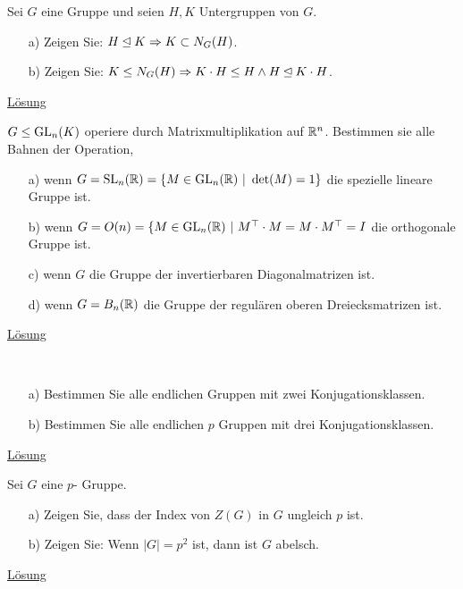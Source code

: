 \begin{exe}\label{aufgabe:2.5} 
	Sei $ G $ eine Gruppe und seien $ H,K $ Untergruppen von $ G $.
	\begin{enumerate}
		\item[a)]
		Zeigen Sie:
		$ H \unlhd K \Rightarrow K \subset N_G(H) $.
		
		\item[b)]
		Zeigen Sie:
		$ K \leq N_G(H) \Rightarrow K \cdot H \leq H  \wedge H \unlhd K \cdot H$. 
	\end{enumerate}
	\hyperlink{loes:2.5}{Lösung}
\end{exe}

\begin{exe}\label{aufgabe:2.6} 
	$ G \leq \operatorname{GL}_n(K) $ operiere durch Matrixmultiplikation auf $ \mathbb{R}^n $.
	Bestimmen sie alle Bahnen der Operation,
	\begin{enumerate}
		\item[a)]
		wenn $ G = \Sl_n(\R) = \lbrace M \in \Gl_n(\R) \ | \ \det(M) = 1 \rbrace $
		die spezielle lineare Gruppe ist.
		
		\item[b)]
		wenn $ G = O(n) = \lbrace M \in \operatorname{GL}_n(\mathbb{R}) \ | \ M^\top \cdot M = M \cdot M^\top = I $ die orthogonale Gruppe ist.
		
		\item[c)]
		wenn $ G $ die Gruppe der invertierbaren Diagonalmatrizen ist.
		
		\item[d)] 
		wenn $ G = B_n(\mathbb{R}) $ die Gruppe der regulären oberen Dreiecksmatrizen ist.
	\end{enumerate}
	\hyperlink{loes:2.6}{Lösung}
\end{exe}

\begin{exe}\ \label{aufgabe:2.7} 
	\begin{enumerate}
		\item[a)]
		Bestimmen Sie alle endlichen Gruppen mit zwei Konjugationsklassen.
		
		\item[b)]
		Bestimmen Sie alle endlichen $ p $ Gruppen mit drei Konjugationsklassen.
	\end{enumerate}
	\hyperlink{loes:2.7}{Lösung}
\end{exe}

\begin{exe}\label{aufgabe:2.8} 
	Sei $ G $ eine $ p $- Gruppe.
	\begin{enumerate}
		\item[a)]
		Zeigen Sie, dass der Index von $ Z(G) $ in $ G $ ungleich $ p $ ist.
		
		\item[b)]
		Zeigen Sie:
		Wenn $ |G| = p^2 $ ist, dann ist $ G $ abelsch.  
	\end{enumerate}
	\hyperlink{loes:2.8}{Lösung}
\end{exe}

